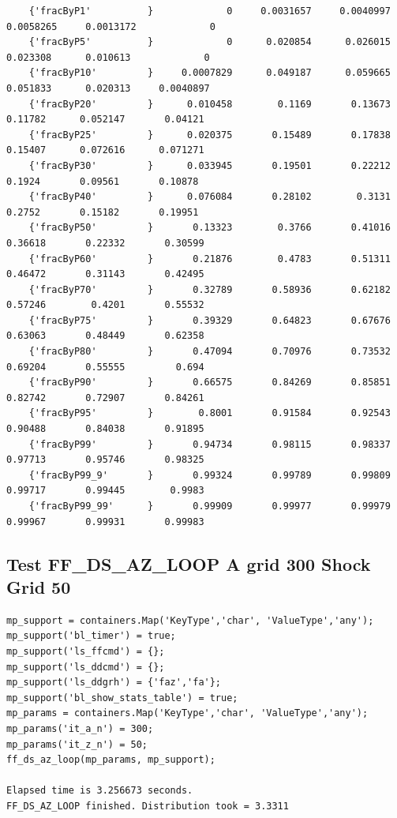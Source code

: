 \documentclass[
]{book}
\begin{document}
\begin{verbatim}
    {'fracByP1'          }             0     0.0031657     0.0040997     0.0058265     0.0013172             0 
    {'fracByP5'          }             0      0.020854      0.026015      0.023308      0.010613             0 
    {'fracByP10'         }     0.0007829      0.049187      0.059665      0.051833      0.020313     0.0040897 
    {'fracByP20'         }      0.010458        0.1169       0.13673       0.11782      0.052147       0.04121 
    {'fracByP25'         }      0.020375       0.15489       0.17838       0.15407      0.072616      0.071271 
    {'fracByP30'         }      0.033945       0.19501       0.22212        0.1924       0.09561       0.10878 
    {'fracByP40'         }      0.076084       0.28102        0.3131        0.2752       0.15182       0.19951 
    {'fracByP50'         }       0.13323        0.3766       0.41016       0.36618       0.22332       0.30599 
    {'fracByP60'         }       0.21876        0.4783       0.51311       0.46472       0.31143       0.42495 
    {'fracByP70'         }       0.32789       0.58936       0.62182       0.57246        0.4201       0.55532 
    {'fracByP75'         }       0.39329       0.64823       0.67676       0.63063       0.48449       0.62358 
    {'fracByP80'         }       0.47094       0.70976       0.73532       0.69204       0.55555         0.694 
    {'fracByP90'         }       0.66575       0.84269       0.85851       0.82742       0.72907       0.84261 
    {'fracByP95'         }        0.8001       0.91584       0.92543       0.90488       0.84038       0.91895 
    {'fracByP99'         }       0.94734       0.98115       0.98337       0.97713       0.95746       0.98325 
    {'fracByP99_9'       }       0.99324       0.99789       0.99809       0.99717       0.99445        0.9983 
    {'fracByP99_99'      }       0.99909       0.99977       0.99979       0.99967       0.99931       0.99983 
\end{verbatim}

\hypertarget{test-ff_ds_az_loop-a-grid-300-shock-grid-50}{%
\subsection{Test FF\_DS\_AZ\_LOOP A grid 300 Shock Grid 50}\label{test-ff_ds_az_loop-a-grid-300-shock-grid-50}}

\begin{verbatim}
mp_support = containers.Map('KeyType','char', 'ValueType','any');
mp_support('bl_timer') = true;
mp_support('ls_ffcmd') = {};
mp_support('ls_ddcmd') = {};
mp_support('ls_ddgrh') = {'faz','fa'};
mp_support('bl_show_stats_table') = true;
mp_params = containers.Map('KeyType','char', 'ValueType','any');
mp_params('it_a_n') = 300;
mp_params('it_z_n') = 50;
ff_ds_az_loop(mp_params, mp_support);

Elapsed time is 3.256673 seconds.
FF_DS_AZ_LOOP finished. Distribution took = 3.3311
\end{verbatim}
\end{document}
